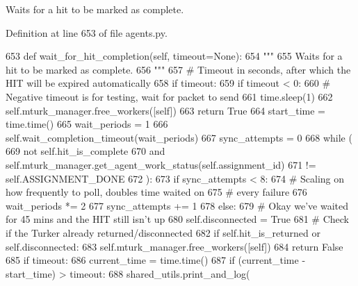 \begin{DoxyVerb}Waits for a hit to be marked as complete.
\end{DoxyVerb}
 

Definition at line 653 of file agents.\+py.


\begin{DoxyCode}
653     \textcolor{keyword}{def }wait\_for\_hit\_completion(self, timeout=None):
654         \textcolor{stringliteral}{"""}
655 \textcolor{stringliteral}{        Waits for a hit to be marked as complete.}
656 \textcolor{stringliteral}{        """}
657         \textcolor{comment}{# Timeout in seconds, after which the HIT will be expired automatically}
658         \textcolor{keywordflow}{if} timeout:
659             \textcolor{keywordflow}{if} timeout < 0:
660                 \textcolor{comment}{# Negative timeout is for testing, wait for packet to send}
661                 time.sleep(1)
662                 self.mturk\_manager.free\_workers([self])
663                 \textcolor{keywordflow}{return} \textcolor{keyword}{True}
664             start\_time = time.time()
665         wait\_periods = 1
666         self.wait\_completion\_timeout(wait\_periods)
667         sync\_attempts = 0
668         \textcolor{keywordflow}{while} (
669             \textcolor{keywordflow}{not} self.hit\_is\_complete
670             \textcolor{keywordflow}{and} self.mturk\_manager.get\_agent\_work\_status(self.assignment\_id)
671             != self.ASSIGNMENT\_DONE
672         ):
673             \textcolor{keywordflow}{if} sync\_attempts < 8:
674                 \textcolor{comment}{# Scaling on how frequently to poll, doubles time waited on}
675                 \textcolor{comment}{# every failure}
676                 wait\_periods *= 2
677                 sync\_attempts += 1
678             \textcolor{keywordflow}{else}:
679                 \textcolor{comment}{# Okay we've waited for 45 mins and the HIT still isn't up}
680                 self.disconnected = \textcolor{keyword}{True}
681             \textcolor{comment}{# Check if the Turker already returned/disconnected}
682             \textcolor{keywordflow}{if} self.hit\_is\_returned \textcolor{keywordflow}{or} self.disconnected:
683                 self.mturk\_manager.free\_workers([self])
684                 \textcolor{keywordflow}{return} \textcolor{keyword}{False}
685             \textcolor{keywordflow}{if} timeout:
686                 current\_time = time.time()
687                 \textcolor{keywordflow}{if} (current\_time - start\_time) > timeout:
688                     shared\_utils.print\_and\_log(

\end{DoxyCode}
